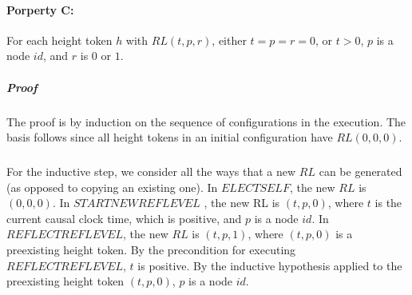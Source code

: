 \paragraph{Porperty C:}For each height token $h$ with $RL (t, p, r)$, either $t = p = r = 0$, or $t > 0$, $p$ is a node $id$, and $r$ is $0$ or $1$.
\subparagraph{Proof}The proof is by induction on the sequence of configurations in the execution. The basis follows since all height tokens in an initial configuration have $RL (0, 0, 0)$.
\subparagraph{}For the inductive step, we consider all the ways that a new $RL$ can be generated (as opposed to copying an existing one). In $ELECTSELF$, the new $RL$ is $(0,0,0)$. In $STARTNEWREFLEVEL$ , the new RL is $(t, p, 0)$, where $t$ is the current causal clock time, which is positive, and $p$ is a node $id$. In $REFLECTREFLEVEL$, the new $RL$ is $(t, p, 1)$, where $(t, p, 0)$ is a preexisting height token. By the precondition for executing $REFLECTREFLEVEL$, $t$ is positive. By the inductive hypothesis applied to the preexisting height token $(t, p, 0)$, $p$ is a node $id$.
